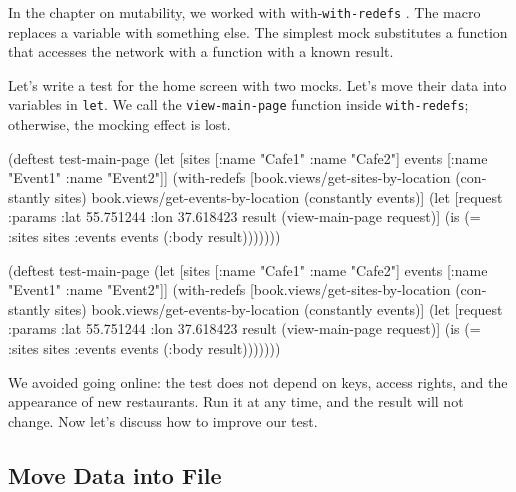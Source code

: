 In the chapter on mutability, we worked with with-\verb|with-redefs| . The macro replaces a variable with something else. The simplest mock substitutes a function that accesses the network with a function with a known result.

Let's write a test for the home screen with two mocks. Let's move their data into variables in \verb|let|. We call the \verb|view-main-page| function inside \verb|with-redefs|; otherwise, the mocking effect is lost.

\ifnarrow

\begin{english}
  \begin{clojure}
(deftest test-main-page
  (let [sites [{:name "Cafe1"}
               {:name "Cafe2"}]
        events [{:name "Event1"}
                {:name "Event2"}]]
    (with-redefs
      [book.views/get-sites-by-location
       (constantly sites)
       book.views/get-events-by-location
       (constantly events)]
      (let [request
            {:params {:lat 55.751244
                      :lon 37.618423}}
            result
            (view-main-page request)]
        (is (= {:sites sites
               :events events}
               (:body result)))))))
  \end{clojure}
\end{english}

\else

\begin{english}
  \begin{clojure}
(deftest test-main-page
  (let [sites [{:name "Cafe1"} {:name "Cafe2"}]
        events [{:name "Event1"} {:name "Event2"}]]
    (with-redefs
      [book.views/get-sites-by-location (constantly sites)
       book.views/get-events-by-location (constantly events)]
      (let [request {:params {:lat 55.751244
                              :lon 37.618423}}
            result (view-main-page request)]
        (is (= {:sites sites :events events}
               (:body result)))))))
  \end{clojure}
\end{english}

\fi

We avoided going online: the test does not depend on keys, access rights, and the appearance of new restaurants. Run it at any time, and the result will not change. Now let's discuss how to improve our test.

\subsection{Move Data into File}

